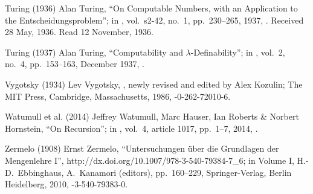  Turing (1936)
Alan Turing,
``On Computable Numbers,
 with an Application to the Entscheidungsproblem'';
in ,
vol.\ s2-42, no.\ 1, pp.\ 230--265, 1937,
.
Received 28 May, 1936. Read 12 November, 1936.

 Turing (1937)
Alan Turing,
``Computability and $\lambda$-Definability''; in
,
vol.\ 2, no.\ 4, pp.\ 153--163, December 1937,
.

 Vygotsky (1934)
Lev Vygotsky,
,
newly revised and edited by Alex Kozulin;
The MIT Press, Cambridge, Massachusetts, 1986,
-0-262-72010-6.

 Watumull et al. (2014)
Jeffrey Watumull, Marc Hauser, Ian Roberts \& Norbert Hornstein,
``On Recursion''; in
,
vol.\ 4, article 1017, pp.\ 1--7, 2014,
.

 Zermelo (1908)
Ernst Zermelo,
``Untersuchungen \"uber die Grundlagen der Mengenlehre I'',
%
{http://dx.doi.org/10.1007/978-3-540-79384-7_6};
in  Volume I,
H.-D.\ Ebbinghaus, A.\ Kanamori (editors),
pp.\ 160--229,
Springer-Verlag, Berlin Heidelberg, 2010,
-3-540-79383-0.

\endinput

